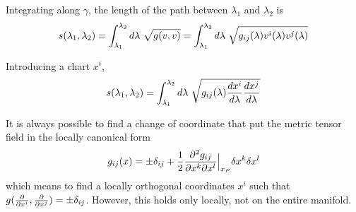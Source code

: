     Integrating along $\gamma$, the length of the path between $\lambda_1$ and $\lambda_2$ is 
    \begin{equation*}
        s(\lambda_1, \lambda_2) = \int_{\lambda_1}^{\lambda_2}d\lambda~ \sqrt{g(v,v)} = \int_{\lambda_1}^{\lambda_2}d\lambda~ \sqrt{g_{ij}(\lambda) v^i(\lambda) v^j(\lambda)}
    \end{equation*}

    Introducing a chart $x^i$, 
    \begin{equation*}
        s(\lambda_1, \lambda_2) = \int_{\lambda_1}^{\lambda_2}d\lambda~ \sqrt{g_{ij}(\lambda) \frac{dx^i}{d\lambda} \frac{dx^j}{d\lambda}}
    \end{equation*}


    It is always possible to find a change of coordinate that put the metric tensor field in the locally canonical form
    \begin{equation*}
        g_{ij} (x) = \pm \delta_{ij} + \frac{1}{2} \frac{\partial^2 g_{ij}}{\partial x^k \partial x^l} \Big\vert_{x_P} \delta x^k \delta x^l
    \end{equation*}
    which means to find a locally orthogonal coordinates $x^i$ such that $g(\frac{\partial}{\partial x^i}, \frac{\partial}{\partial x^j}) = \pm \delta_{ij}$. However, this holds only locally, not on the entire manifold.


